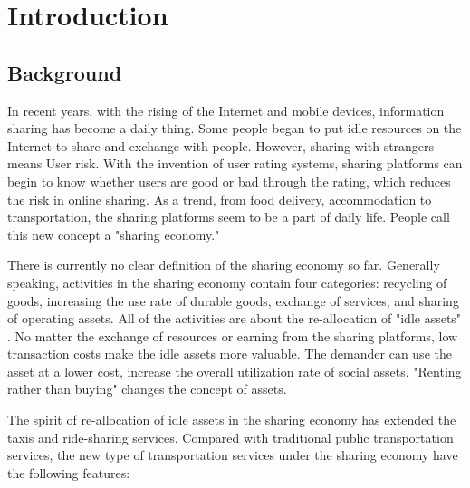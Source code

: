 
\chapter{Introduction}

\section{Background}

In recent years, with the rising of the Internet and mobile devices, information sharing has become a daily thing. Some people began to put idle resources on the Internet to share and exchange with people. However, sharing with strangers means User risk. With the invention of user rating systems, sharing platforms can begin to know whether users are good or bad through the rating, which reduces the risk in online sharing\cite{schor_debating_2014}. As a trend, from food delivery, accommodation to transportation, the sharing platforms seem to be a part of daily life. People call this new concept a "sharing economy."

There is currently no clear definition of the sharing economy so far. Generally speaking, activities in the sharing economy contain four categories: recycling of goods, increasing the use rate of durable goods, exchange of services, and sharing of operating assets\cite{ schor_debating_2014}. All of the activities are about the re-allocation of "idle assets" \cite{frenken_smarter_2015}. No matter the exchange of resources or earning from the sharing platforms, low transaction costs make the idle assets more valuable. The demander can use the asset at a lower cost, increase the overall utilization rate of social assets. "Renting rather than buying" changes the concept of assets.

The spirit of re-allocation of idle assets in the sharing economy has extended the taxis and ride-sharing services. Compared with traditional public transportation services, the new type of transportation services under the sharing economy have the following features:
  
